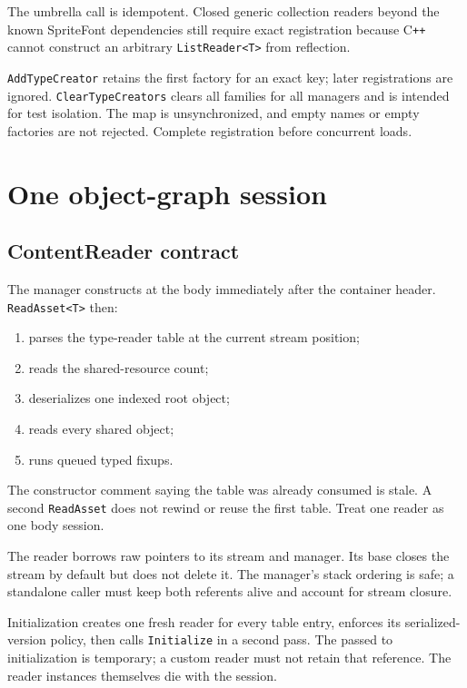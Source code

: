 The umbrella call is idempotent. Closed generic collection readers beyond the known SpriteFont
dependencies still require exact registration because C\texttt{++} cannot construct an arbitrary
\texttt{ListReader<T>} from reflection.

\texttt{AddTypeCreator} retains the first factory for an exact key; later registrations are
ignored. \texttt{ClearTypeCreators} clears all families for all managers and is intended for
test isolation. The map is unsynchronized, and empty names or empty factories are not rejected.
Complete registration before concurrent loads.

\section{One object-graph session}

\subsection{ContentReader contract}
\label{sec:content-reader-contract}

The manager constructs  at the body immediately after the container
header. \texttt{ReadAsset<T>} then:

\begin{enumerate}
  \item parses the type-reader table at the current stream position;
  \item reads the shared-resource count;
  \item deserializes one indexed root object;
  \item reads every shared object;
  \item runs queued typed fixups.
\end{enumerate}

The constructor comment saying the table was already consumed is stale. A second
\texttt{ReadAsset} does not rewind or reuse the first table. Treat one reader as one body
session.

The reader borrows raw pointers to its stream and manager. Its base
 closes the stream by default but does not delete it. The manager's stack
ordering is safe; a standalone caller must keep both referents alive and account for stream
closure.

Initialization creates one fresh reader for every table entry, enforces its serialized-version
policy, then calls \texttt{Initialize} in a second pass. The
 passed to initialization is temporary; a custom reader must
not retain that reference. The reader instances themselves die with the session.

